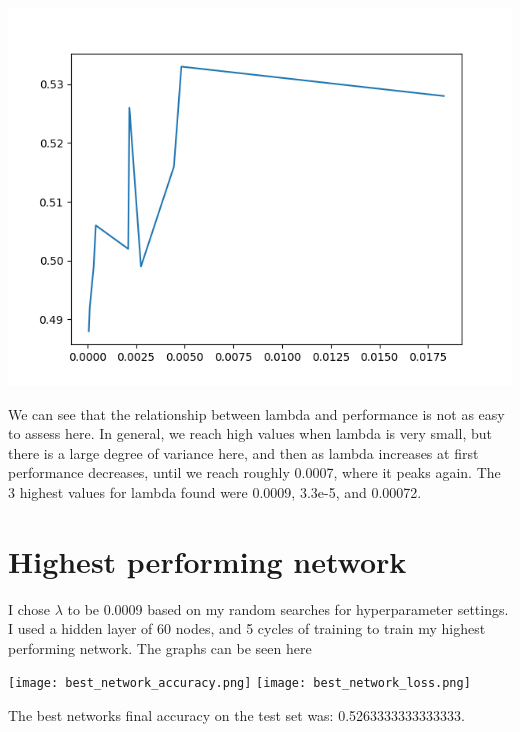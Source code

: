 \documentclass[11pt,a4paper]{article}
\begin{document}
\includegraphics[width=\textwidth]{fine_search.png}

We can see that the relationship between lambda and performance is not as easy to assess here. In general, we reach high values when lambda is very small, but there is a large degree of variance here, and then as lambda increases at first performance decreases, until we reach roughly 0.0007, where it peaks again. The 3 highest values for lambda found were 0.0009, 3.3e-5, and 0.00072. 


\section{Highest performing network}
I chose $\lambda$ to be 0.0009 based on my random searches for hyperparameter settings. I used a hidden layer of 60 nodes, and 5 cycles of training to train my highest performing network. The graphs can be seen here

\texttt{[image: best\_network\_accuracy.png]}
\texttt{[image: best\_network\_loss.png]}

The best networks final accuracy on the test set was: 0.5263333333333333.
\end{document}
